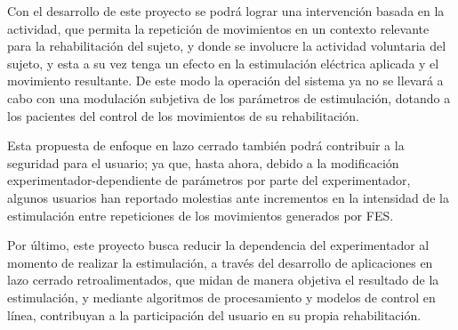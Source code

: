 

Con el desarrollo de este proyecto se podrá lograr una intervención basada en la actividad, que permita la repetición de movimientos en un contexto relevante para la rehabilitación del sujeto, y donde se involucre la actividad voluntaria del sujeto, y esta a su vez tenga un efecto en la estimulación eléctrica aplicada y el movimiento resultante. De este modo la operación del sistema ya no se llevará a cabo con una modulación subjetiva de los parámetros de estimulación, dotando a los pacientes del control de los movimientos de su rehabilitación.

Esta propuesta de enfoque en lazo cerrado también podrá contribuir a la seguridad para el usuario; ya que, hasta ahora, debido a la modificación experimentador-dependiente de parámetros por parte del experimentador, algunos usuarios han reportado molestias ante incrementos en la intensidad de la estimulación entre repeticiones de los movimientos generados por FES.

Por último, este proyecto busca reducir la dependencia del experimentador al momento de realizar la estimulación, a través del desarrollo de aplicaciones en lazo cerrado retroalimentados, que midan de manera objetiva el resultado de la estimulación, y mediante algoritmos de procesamiento y modelos de control en línea, contribuyan a la participación del usuario en su propia rehabilitación.